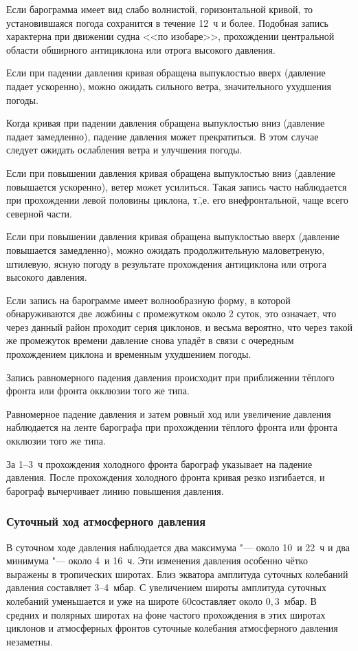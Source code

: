  Если барограмма имеет вид слабо волнистой, горизонтальной
кривой, то установившаяся погода сохранится в течение 12~ч и
более. Подобная запись характерна при движении судна <<по изобаре>>,
прохождении центральной области обширного антициклона или отрога
высокого давления.

 Если при падении давления кривая обращена выпуклостью вверх
(давление падает ускоренно), можно ожидать сильного ветра,
значительного ухудшения погоды.

 Когда кривая при падении давления обращена выпуклостью вниз
(давление падает замедленно), падение давления может прекратиться. В
этом случае следует ожидать ослабления ветра и улучшения погоды.

 Если при повышении давления кривая обращена выпуклостью вниз
(давление повышается ускоренно), ветер может усилиться. Такая запись
часто наблюдается при прохождении левой половины циклона, т.\=,е. его
внефронтальной, чаще всего северной части.

 Если при повышении давления кривая обращена выпуклостью вверх
(давление повышается замедленно), можно ожидать продолжительную
маловетреную, штилевую, ясную погоду в результате прохождения
антициклона или отрога высокого давления.

 Если запись на барограмме имеет волнообразную форму, в которой
обнаруживаются две ложбины с промежутком около 2 суток, это означает,
что через данный район проходит серия циклонов, и весьма вероятно, что
через такой же промежуток времени давление снова упадёт в связи с
очередным прохождением циклона и временным ухудшением погоды.

 Запись равномерного падения давления происходит при
приближении тёплого фронта или фронта окклюзии того же типа.

 Равномерное падение давления и затем ровный ход или увеличение
давления наблюдается на ленте барографа при прохождении тёплого фронта
или фронта окклюзии того же типа.

 За 1--3~ч прохождения холодного фронта барограф указывает на
падение давления. После прохождения холодного фронта кривая резко
изгибается, и барограф вычерчивает линию повышения давления.

\subsubsection{Суточный ход атмосферного давления}

В суточном ходе давления наблюдается два максимума "--- около 10~и 22~ч и
два минимума "--- около 4~и 16~ч. Эти изменения давления особенно чётко
выражены в тропических широтах. Близ экватора амплитуда суточных
колебаний давления составляет 3--4~мбар. С увеличением широты амплитуда
суточных колебаний уменьшается и уже на широте 60\gr составляет около
$0,3$~мбар. В средних и полярных широтах на фоне частого прохождения в
этих широтах циклонов и атмосферных фронтов суточные колебания
атмосферного давления незаметны.

